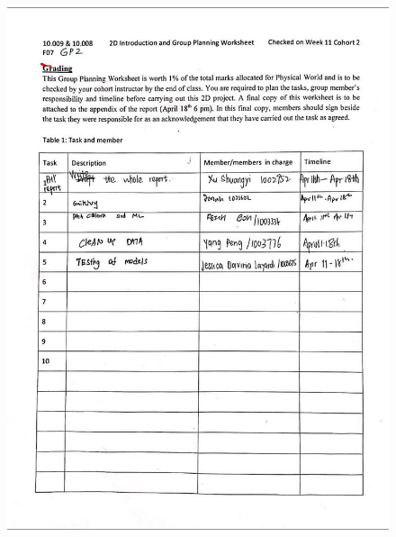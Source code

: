 \documentclass[10pt]{article}
\begin{document}
\begin{appendices}
\begin{figure}[bp!]
\includegraphics[scale=0.35]{2}
\end{figure}
\newpage

\end{appendices}
\end{document}
